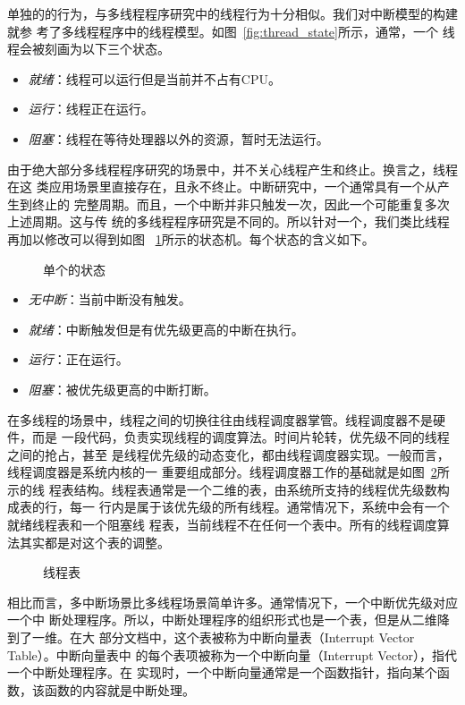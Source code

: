单独的的行为，与多线程程序研究中的线程行为十分相似。我们对中断模型的构建就参
考了多线程程序中的线程模型。如图~\ref{fig:thread_state}所示，通常，一个
线程会被刻画为以下三个状态。
\begin{itemize}
	\item \emph{就绪}：线程可以运行但是当前并不占有CPU。
	\item \emph{运行}：线程正在运行。
	\item \emph{阻塞}：线程在等待处理器以外的资源，暂时无法运行。
\end{itemize}
由于绝大部分多线程程序研究的场景中，并不关心线程产生和终止。换言之，线程在这
类应用场景里直接存在，且永不终止。中断研究中，一个通常具有一个从产生到终止的
完整周期。而且，一个中断并非只触发一次，因此一个可能重复多次上述周期。这与传
统的多线程程序研究是不同的。所以针对一个，我们类比线程再加以修改可以得到如图
~\ref{fig:interrupt_state}所示的状态机。每个状态的含义如下。

\begin{figure}[H]
	\centering
	
	\caption{单个的状态}
	\label{fig:interrupt_state}
\end{figure}

\begin{itemize}
	\item \emph{无中断}：当前中断没有触发。
	\item \emph{就绪}：中断触发但是有优先级更高的中断在执行。
	\item \emph{运行}：正在运行。
	\item \emph{阻塞}：被优先级更高的中断打断。
\end{itemize}

在多线程的场景中，线程之间的切换往往由线程调度器掌管。线程调度器不是硬件，而是
一段代码，负责实现线程的调度算法。时间片轮转，优先级不同的线程之间的抢占，甚至
是线程优先级的动态变化，都由线程调度器实现。一般而言，线程调度器是系统内核的一
重要组成部分。线程调度器工作的基础就是如图~\ref{fig:thread_table}所示的线
程表结构。线程表通常是一个二维的表，由系统所支持的线程优先级数构成表的行，每一
行内是属于该优先级的所有线程。通常情况下，系统中会有一个就绪线程表和一个阻塞线
程表，当前线程不在任何一个表中。所有的线程调度算法其实都是对这个表的调整。

\begin{figure}
	\centering
	
	\caption{线程表}
	\label{fig:thread_table}
\end{figure}

相比而言，多中断场景比多线程场景简单许多。通常情况下，一个中断优先级对应一个中
断处理程序。所以，中断处理程序的组织形式也是一个表，但是从二维降到了一维。在大
部分文档中，这个表被称为中断向量表（Interrupt Vector Table）。中断向量表中
的每个表项被称为一个中断向量（Interrupt Vector），指代一个中断处理程序。在
实现时，一个中断向量通常是一个函数指针，指向某个函数，该函数的内容就是中断处理。

